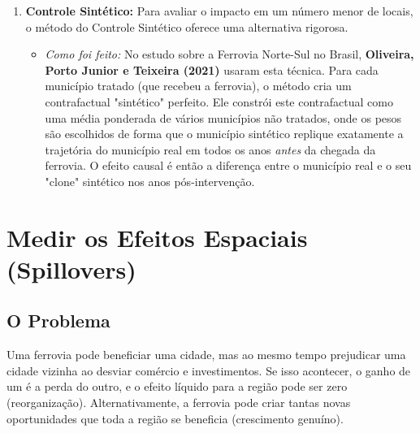 \documentclass[12pt, a4paper]{article}
\begin{document}
\begin{enumerate}[label=\arabic*.]
    \begin{itemize}
        \item \textit{Como foi feito:} O estudo de \textbf{Lindgren et al. (2021)} sobre a Suécia é um exemplo de excelência na validação do método. A principal premissa do DiD é que os dois grupos tinham "tendências paralelas" antes da chegada da ferrovia. Para provar isso, eles não apenas mostraram um gráfico, mas realizaram um estudo de eventos formal para o período pré-tratamento. Eles estimaram o "efeito" da futura ferrovia para cada um dos 25 anos \textit{antes} de sua construção e mostraram que todos os coeficientes estimados eram estatisticamente indistinguíveis de zero. Esta bateria de testes de placebo confirmou que os grupos eram de fato comparáveis, tornando muito mais crível que qualquer divergência \textit{após} a construção se deva, de fato, à ferrovia.
    \end{itemize}
    
    \item \textbf{Controle Sintético:} Para avaliar o impacto em um número menor de locais, o método do Controle Sintético oferece uma alternativa rigorosa.
    \begin{itemize}
        \item \textit{Como foi feito:} No estudo sobre a Ferrovia Norte-Sul no Brasil, \textbf{Oliveira, Porto Junior e Teixeira (2021)} usaram esta técnica. Para cada município tratado (que recebeu a ferrovia), o método cria um contrafactual "sintético" perfeito. Ele constrói este contrafactual como uma média ponderada de vários municípios não tratados, onde os pesos são escolhidos de forma que o município sintético replique exatamente a trajetória do município real em todos os anos \textit{antes} da chegada da ferrovia. O efeito causal é então a diferença entre o município real e o seu "clone" sintético nos anos pós-intervenção.
    \end{itemize}
\end{enumerate}

\section{Medir os Efeitos Espaciais (Spillovers)}

\subsection{O Problema}

Uma ferrovia pode beneficiar uma cidade, mas ao mesmo tempo prejudicar uma cidade vizinha ao desviar comércio e investimentos. Se isso acontecer, o ganho de um é a perda do outro, e o efeito líquido para a região pode ser zero (reorganização). Alternativamente, a ferrovia pode criar tantas novas oportunidades que toda a região se beneficia (crescimento genuíno).
\end{document}
